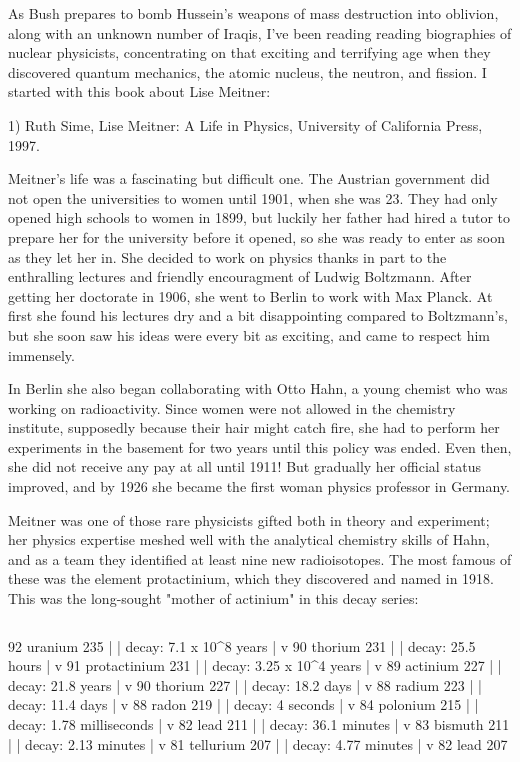 




As Bush prepares to bomb Hussein's weapons of mass destruction into
oblivion, along with an unknown number of Iraqis, I've been reading
reading biographies of nuclear physicists, concentrating on that
exciting and terrifying age when they discovered quantum mechanics, 
the atomic nucleus, the neutron, and fission.  I started with this book
about Lise Meitner:

1) Ruth Sime, Lise Meitner: A Life in Physics, University of California
Press, 1997.

Meitner's life was a fascinating but difficult one.  The Austrian
government did not open the universities to women until 1901, when she
was 23.  They had only opened high schools to women in 1899, but
luckily her father had hired a tutor to prepare her for the university
before it opened, so she was ready to enter as soon as they let her in.
She decided to work on physics thanks in part to the enthralling
lectures and friendly encouragment of Ludwig Boltzmann.  After getting
her doctorate in 1906, she went to Berlin to work with Max Planck.  At
first she found his lectures dry and a bit disappointing compared to
Boltzmann's, but she soon saw his ideas were every bit as exciting, and
came to respect him immensely.

In Berlin she also began collaborating with Otto Hahn, a young chemist
who was working on radioactivity.  Since women were not allowed in the
chemistry institute, supposedly because their hair might catch fire,
she had to perform her experiments in the basement for two years until
this policy was ended.  Even then, she did not receive any pay at all
until 1911!  But gradually her official status improved, and by 1926 she
became the first woman physics professor in Germany.

Meitner was one of those rare physicists gifted both in theory and
experiment; her physics expertise meshed well with the analytical
chemistry skills of Hahn, and as a team they identified at least nine
new radioisotopes.  The most famous of these was the element
protactinium, which they discovered and named in 1918.  This was the
long-sought "mother of actinium" in this decay series:


$$

92 uranium 235    
     |
     | \alpha  decay: 7.1 x 10^8 years    
     |
     v
90 thorium 231 
     |
     | \beta  decay: 25.5 hours             
     |                                  
     v
91 protactinium 231                       
     |                                
     | \alpha  decay: 3.25 x 10^4 years 
     |
     v
89 actinium 227
     |
     | \beta  decay: 21.8 years
     |
     v
90 thorium 227
     |
     | \alpha  decay: 18.2 days
     |
     v
88 radium 223 
     |
     | \alpha  decay: 11.4 days
     |
     v
88 radon 219
     |
     | \alpha  decay: 4 seconds 
     |
     v
84 polonium 215
     |
     | \alpha  decay: 1.78 milliseconds
     |
     v
82 lead 211
     |
     | \beta  decay: 36.1 minutes
     |
     v
83 bismuth 211 
     |
     | \alpha  decay: 2.13 minutes
     |
     v
81 tellurium 207
     |
     | \beta  decay: 4.77 minutes
     |
     v
82 lead 207 

